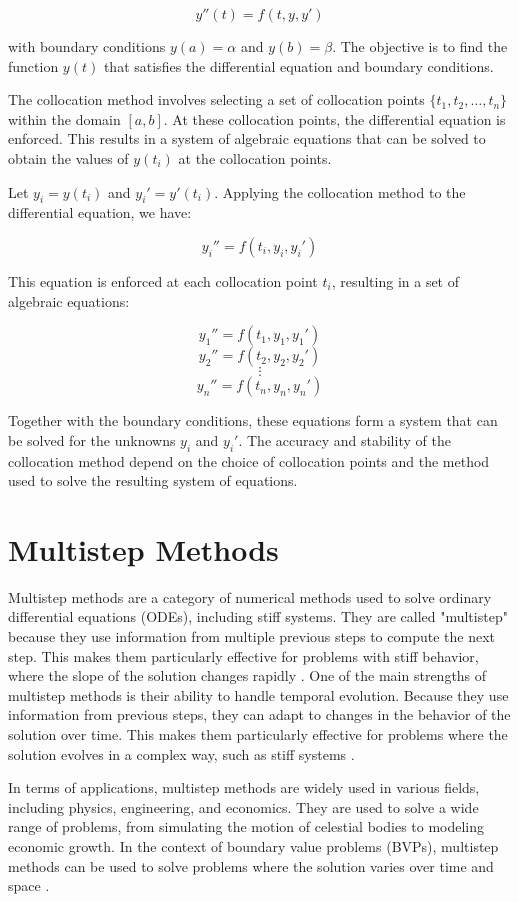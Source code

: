 \[
y''(t) = f(t, y, y')
\]

with boundary conditions \(y(a) = \alpha\) and \(y(b) = \beta\). The objective is to find the function \(y(t)\) that satisfies the differential equation and boundary conditions.

The collocation method involves selecting a set of collocation points \(\{t_1, t_2, \ldots, t_n\}\) within the domain \([a, b]\). At these collocation points, the differential equation is enforced. This results in a system of algebraic equations that can be solved to obtain the values of \(y(t_i)\) at the collocation points.

Let \(y_i = y(t_i)\) and \(y_i' = y'(t_i)\). Applying the collocation method to the differential equation, we have:

\[
y_i'' = f(t_i, y_i, y_i')
\]

This equation is enforced at each collocation point \(t_i\), resulting in a set of algebraic equations:

\[
y_1'' = f(t_1, y_1, y_1')
\]
\[
y_2'' = f(t_2, y_2, y_2')
\]
\[
\vdots
\]
\[
y_n'' = f(t_n, y_n, y_n')
\]

Together with the boundary conditions, these equations form a system that can be solved for the unknowns \(y_i\) and \(y_i'\). The accuracy and stability of the collocation method depend on the choice of collocation points and the method used to solve the resulting system of equations.



\section{Multistep Methods}
Multistep methods are a category of numerical methods used to solve ordinary differential equations (ODEs), including stiff systems. They are called "multistep" because they use information from multiple previous steps to compute the next step. This makes them particularly effective for problems with stiff behavior, where the slope of the solution changes rapidly \cite{math7121158}.
One of the main strengths of multistep methods is their ability to handle temporal evolution. Because they use information from previous steps, they can adapt to changes in the behavior of the solution over time. This makes them particularly effective for problems where the solution evolves in a complex way, such as stiff systems \cite{math7121158}.

In terms of applications, multistep methods are widely used in various fields, including physics, engineering, and economics. They are used to solve a wide range of problems, from simulating the motion of celestial bodies to modeling economic growth. In the context of boundary value problems (BVPs), multistep methods can be used to solve problems where the solution varies over time and space \cite{math7121158}.

